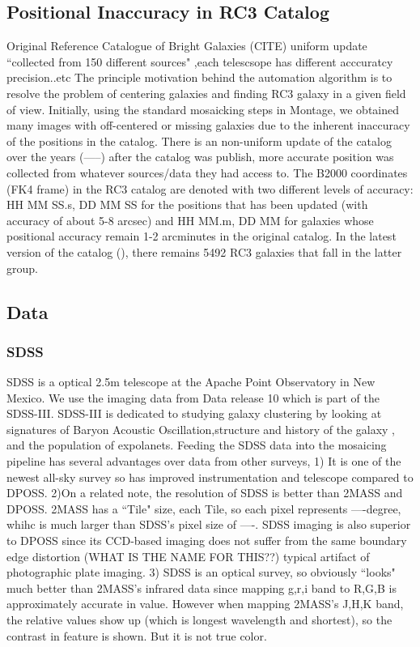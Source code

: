 \documentclass[5p]{elsarticle}
\begin{document}
	\subsection{Positional Inaccuracy in RC3 Catalog}
Original Reference Catalogue of Bright Galaxies (CITE)
	uniform update ``collected from 150 different sources" ,each telescsope has different acccuratcy precision..etc
	The principle motivation behind the automation algorithm is to resolve the problem of centering galaxies and finding RC3 galaxy in a given field of view. Initially, using the standard mosaicking steps in Montage, we obtained many images with  off-centered or missing galaxies due to the inherent inaccuracy of the positions in the catalog. 
There is an non-uniform update of the catalog over the years (-----) after the catalog was publish, more accurate position was collected from whatever sources/data they had access to.
The B2000 coordinates (FK4 frame) in the RC3 catalog are denoted with two different levels of accuracy: HH MM SS.s, DD MM SS for the positions that has been updated  (with accuracy of about 5-8 arcsec) and  HH MM.m, DD MM for galaxies whose positional accuracy remain  1-2 arcminutes in the original catalog.  In the latest version of the catalog (\citet{rc31991}), there remains 5492 RC3 galaxies that fall in the latter group.
\subsection{Data}
	\subsubsection{SDSS}
	SDSS is a optical 
	2.5m telescope at the Apache Point Observatory in New Mexico. We use the imaging data from Data release 10 which is part of the SDSS-III. SDSS-III is dedicated to studying galaxy clustering by looking at signatures of Baryon Acoustic Oscillation,structure and history of the galaxy , and the population of expolanets. Feeding the SDSS data into the mosaicing pipeline has several advantages over data from other surveys, 
1) It is  one of the newest all-sky survey so has improved instrumentation and telescope compared to DPOSS. 
2)On a related note, the resolution of SDSS is better than 2MASS and DPOSS.  2MASS has a ``Tile" size, each Tile, so each pixel represents ----degree, whihc is much larger than  SDSS's pixel size of ----. SDSS imaging is also superior to DPOSS since its CCD-based imaging does not suffer from the same  boundary edge distortion (WHAT IS THE NAME FOR THIS??) typical artifact of photographic plate imaging.
3) SDSS is an optical survey, so obviously ``looks" much better than 2MASS's infrared data since mapping g,r,i band to R,G,B is approximately accurate in value. However when mapping 2MASS's J,H,K band, the relative values show up (which is longest wavelength and shortest), so the contrast in feature is shown. But it is not true color.
	
\end{document}
